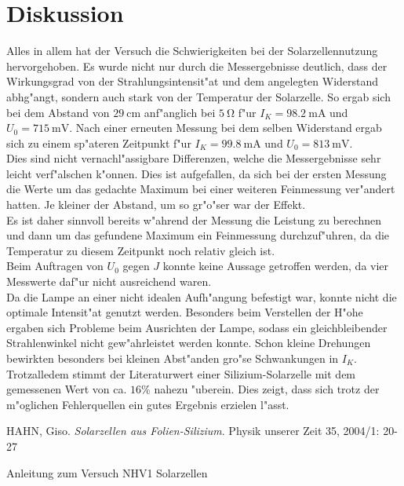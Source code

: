 \newpage
\section{Diskussion}
	\label{sec:diskussion}

	Alles in allem hat der Versuch die Schwierigkeiten bei der Solarzellennutzung hervorgehoben.
	Es wurde nicht nur durch die Messergebnisse deutlich, dass der Wirkungsgrad von der Strahlungsintensit"at und dem angelegten Widerstand abhg"angt, sondern auch stark von der Temperatur der Solarzelle.
	So ergab sich bei dem Abstand von $\SI{29}{\centi\meter}$ anf"anglich bei $\SI{5}{\ohm}$ f"ur $I_K = \SI{98.2}{\milli\ampere}$ und $U_0 = \SI{715}{\milli\volt}$.
	Nach einer erneuten Messung bei dem selben Widerstand ergab sich zu einem sp"ateren Zeitpunkt f"ur $I_K = \SI{99.8}{\milli\ampere}$ und $U_0 = \SI{813}{\milli\volt}$.\\ 
	Dies sind nicht vernachl"assigbare Differenzen, welche die Messergebnisse sehr leicht verf"alschen k"onnen.
	Dies ist aufgefallen, da sich bei der ersten Messung die Werte um das gedachte Maximum bei einer weiteren Feinmessung ver"andert hatten.
	Je kleiner der Abstand, um so gr"o"ser war der Effekt.\\
	Es ist daher sinnvoll bereits w"ahrend der Messung die Leistung zu berechnen und dann um das gefundene Maximum ein Feinmessung durchzuf"uhren, da die Temperatur zu diesem Zeitpunkt noch relativ gleich ist.\\
	Beim Auftragen von $U_0$ gegen $J$ konnte keine Aussage getroffen werden, da vier Messwerte daf"ur nicht ausreichend waren.\\
	Da die Lampe an einer nicht idealen Aufh"angung befestigt war, konnte nicht die optimale Intensit"at genutzt werden.
	Besonders beim Verstellen der H"ohe ergaben sich Probleme beim Ausrichten der Lampe, sodass ein gleichbleibender Strahlenwinkel nicht gew"ahrleistet werden konnte.
	Schon kleine Drehungen bewirkten besonders bei kleinen Abst"anden gro"se Schwankungen in $I_K$.\\
	Trotzalledem stimmt der Literaturwert einer Silizium-Solarzelle  mit dem gemessenen Wert von ca. $16\%$ nahezu "uberein.
	Dies zeigt, dass sich trotz der m"oglichen Fehlerquellen ein gutes Ergebnis erzielen l"asst.

\begin{thebibliography}{9}
	 HAHN, Giso. \emph{Solarzellen aus Folien-Silizium}. Physik unserer Zeit 35, 2004/1: 20-27

	 Anleitung zum Versuch NHV1 Solarzellen
\end{thebibliography}